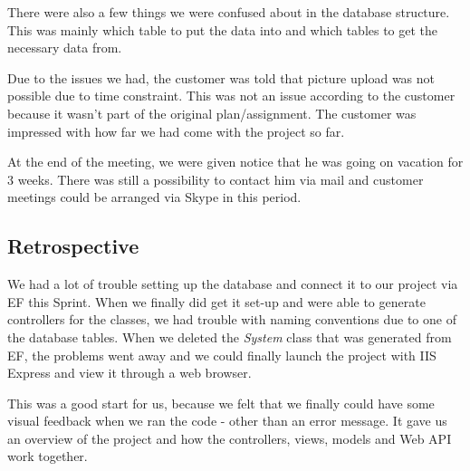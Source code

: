 There were also a few things we were confused about in the database structure. This was mainly which table to put the data into and which tables to get the necessary data from.

Due to the issues we had, the customer was told that picture upload was not possible due to time constraint. This was not an issue according to the customer because it wasn't part of the original plan/assignment. The customer was impressed with how far we had come with the project so far.

At the end of the meeting, we were given notice that he was going on vacation for 3 weeks. There was still a possibility to contact him via mail and customer meetings could be arranged via Skype in this period.

\subsection{Retrospective}
We had a lot of trouble setting up the database and connect it to our project via EF this Sprint. When we finally did get it set-up and were able to generate controllers for the classes, we had trouble with naming conventions due to one of the database tables. When we deleted the \emph{System} class that was generated from EF, the problems went away and we could finally launch the project with IIS Express and view it through a web browser.

This was a good start for us, because we felt that we finally could have some visual feedback when we ran the code - other than an error message. It gave us an overview of the project and how the controllers, views, models and Web API work together.